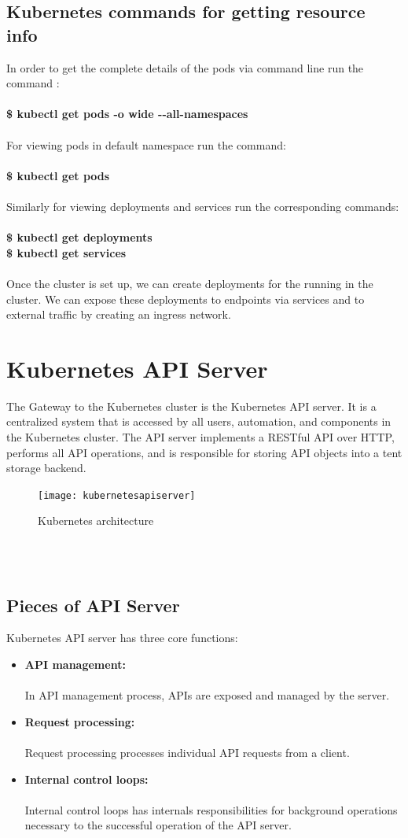 \documentclass[12pt]{report}
\begin{document}
\subsection{Kubernetes commands for getting resource info}
In order to get the complete details of  the pods via command line run the command :\\\\
\textbf{\$ kubectl get pods -o wide -{}-all-namespaces}\\\\
For viewing pods in default namespace run the command:\\\\
\textbf{\$ kubectl get pods}\\\\
Similarly for viewing deployments and services run the corresponding commands:\\\\
\textbf{\$ kubectl get deployments}\\
\textbf{\$ kubectl get services}\\\\
Once the cluster is set up, we can create deployments for the running in the cluster. We can expose these deployments to endpoints via services and to external traffic by creating an ingress network.
\section{Kubernetes API Server}
The Gateway to the Kubernetes cluster is the Kubernetes API server. It is a centralized system that is accessed by all users, automation, and components in the Kubernetes cluster. The API server implements a RESTful API over HTTP, performs all API operations, and is responsible for storing API objects into a tent storage backend.
\begin{figure}[h!]
	\begin{center}
		\texttt{[image: kubernetesapiserver]}
		\caption{Kubernetes architecture \cite{KArc}}
	\end{center}
\end{figure}
\\\\
\subsection{Pieces of API Server}
Kubernetes API server has three core functions:
\begin{itemize}
	\item \textbf{API management:}\\\\
	In API management process, APIs are exposed and managed by the server.
	\item \textbf{Request processing:}\\\\
	Request processing processes individual API requests from a client.
	\item \textbf{Internal control loops:}\\\\
	Internal control loops has internals responsibilities for background operations necessary to the successful operation of the API server.
\end{itemize}
\end{document}
